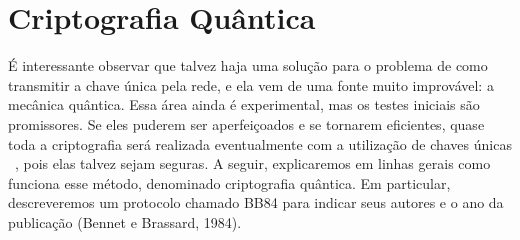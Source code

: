  
 \section{Criptografia Quântica}
 
 É interessante observar que talvez haja uma solução para o problema de como transmitir a chave única pela rede, e ela vem de uma fonte muito improvável: a mecânica quântica. Essa área ainda é experimental, mas os testes iniciais são promissores. Se eles puderem ser aperfeiçoados e se tornarem eficientes, quase toda a criptografia será realizada eventualmente com a utilização de chaves únicas ~\cite{tanenbaum}, pois elas talvez sejam seguras. A seguir, explicaremos em linhas gerais como funciona esse método, denominado criptografia quântica. Em particular, descreveremos um protocolo chamado BB84 para indicar seus autores e o ano da publicação (Bennet e Brassard, 1984).

